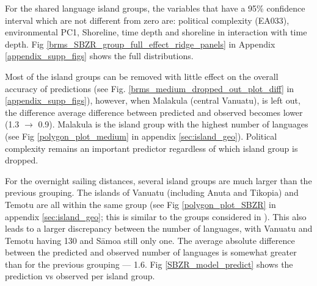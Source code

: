 \documentclass[unnumsec,webpdf,modern,medium]{oup-authoring-template}
\begin{document}
For the shared language island groups, the variables that have a 95\% confidence interval which are not different from zero are: political complexity (EA033), environmental PC1, Shoreline, time depth and shoreline in interaction with time depth. Fig \ref{brms_SBZR_group_full_effect_ridge_panels} in Appendix \ref{appendix_supp_figs} shows the full distributions.


Most of the island groups can be removed with little effect on the overall accuracy of predictions (see Fig. \ref{brms_medium_dropped_out_plot_diff} in \ref{appendix_supp_figs}), however, when Malakula (central Vanuatu), is left out, the difference average difference between predicted and observed becomes lower (1.3 $\rightarrow$ 0.9). Malakula is the island group with the highest number of languages (see Fig \ref{polygon_plot_medium} in appendix \ref{sec:island_geo}). Political complexity remains an important predictor regardless of which island group is dropped.


For the overnight sailing distances, several island groups are much larger than the previous grouping. The islands of Vanuatu  (including Anuta and Tikopia) and Temotu are all within the same group (see Fig \ref{polygon_plot_SBZR} in appendix \ref{sec:island_geo}; this is similar to the groups considered in \citet{pawley2007}). This also leads to a larger discrepancy between the number of languages, with Vanuatu and Temotu having 130 and S\={a}moa still only one. The average absolute difference between the predicted and observed number of languages is somewhat greater than for the previous grouping --- 1.6. Fig \ref{SBZR_model_predict} shows the prediction vs observed per island group.
\end{document}
